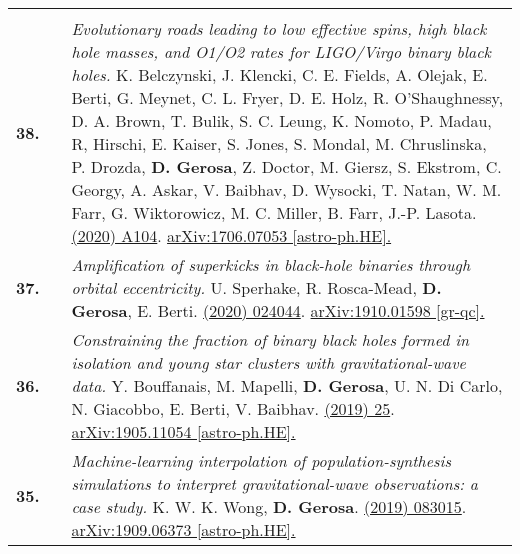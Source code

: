 {\begin{longtable}{rp{0.3cm}p{15.8cm}}
\vspace{0.09cm}\\
%
\textbf{38.} & & \textit{Evolutionary roads leading to low effective spins, high black hole masses, and O1/O2 rates for LIGO/Virgo binary black holes.}
\newline{}
K. Belczynski, J. Klencki, C. E. Fields, A. Olejak, E. Berti, G. Meynet, C. L. Fryer, D. E. Holz, R. O'Shaughnessy, D. A. Brown, T. Bulik, S. C. Leung,  K. Nomoto, P. Madau, R, Hirschi, E. Kaiser, S. Jones, S. Mondal, M. Chruslinska, P. Drozda, \textbf{D. Gerosa}, Z. Doctor, M. Giersz, S. Ekstr\:om, C. Georgy, A. Askar, V. Baibhav, D. Wysocki, T. Natan, W. M. Farr, G. Wiktorowicz, M. C. Miller, B. Farr, J.-P. Lasota.
\newline{}
\href{https://www.aanda.org/articles/aa/full_html/2020/04/aa36528-19/aa36528-19.html}{\aap 636 (2020) A104}. \href{https://arxiv.org/abs/1706.07053}{arXiv:1706.07053 [astro-ph.HE].}
\vspace{0.09cm}\\
%
\textbf{37.} & & \textit{Amplification of superkicks in black-hole binaries through orbital eccentricity.}
\newline{}
U. Sperhake, R. Rosca-Mead, \textbf{D. Gerosa}, E. Berti.
\newline{}
\href{https://journals.aps.org/prd/abstract/10.1103/PhysRevD.101.024044}{\prd 101 (2020) 024044}. \href{https://arxiv.org/abs/1910.01598}{arXiv:1910.01598 [gr-qc].}
\vspace{0.09cm}\\
%
\textbf{36.} & & \textit{Constraining the fraction of binary black holes formed in isolation and young star clusters with gravitational-wave data.}
\newline{}
Y. Bouffanais, M. Mapelli, \textbf{D. Gerosa}, U. N. Di Carlo, N. Giacobbo, E. Berti, V. Baibhav.
\newline{}
\href{https://iopscience.iop.org/article/10.3847/1538-4357/ab4a79}{\apj 886 (2019) 25}. \href{https://arxiv.org/abs/1905.11054}{arXiv:1905.11054 [astro-ph.HE].}
\vspace{0.09cm}\\
%
\textbf{35.} & & \textit{Machine-learning interpolation of population-synthesis simulations to interpret gravitational-wave observations: a case study.}
\newline{}
K. W. K. Wong, \textbf{D. Gerosa}.
\newline{}
\href{https://journals.aps.org/prd/abstract/10.1103/PhysRevD.100.083015}{\prd 100 (2019) 083015}. \href{https://arxiv.org/abs/1909.06373}{arXiv:1909.06373 [astro-ph.HE].}

\end{longtable}}
